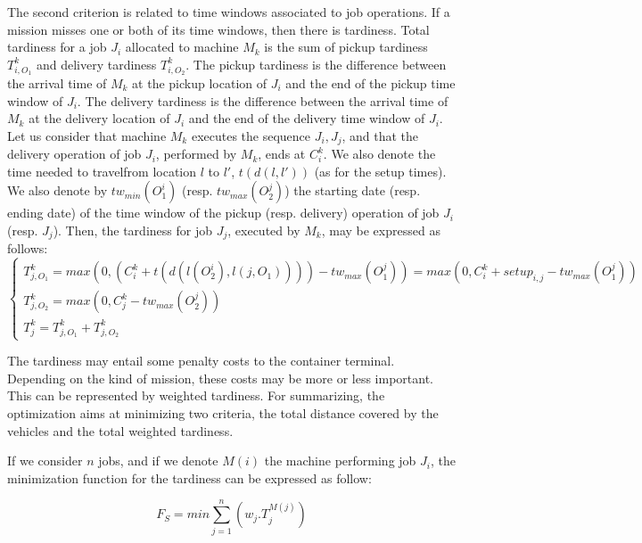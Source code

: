 \documentclass[a4paper,12pt]{article}
\begin{document}
The second criterion is related to time windows associated to job operations. If a mission misses one or both of its time windows, then there is tardiness. Total tardiness for a job $J_i$ allocated to machine $M_k$ is the sum of pickup tardiness $T^k_{i,O_1}$ and delivery tardiness $T^k_{i,O_2}$. The pickup tardiness is the difference between the arrival time of $M_k$ at the pickup location of $J_i$ and the end of the pickup time window of $J_i$. The delivery tardiness is the difference between the arrival time of $M_k$ at the delivery location of $J_i$ and the end of the delivery time window of $J_i$. \\

Let us consider that machine $M_k$ executes the sequence $J_i,J_j$, and that the delivery operation of job $J_i$, performed by $M_k$, ends at $C^k_i$. We also denote the time needed to travelfrom location $l$ to $l'$, $t(d(l,l'))$ (as for the setup times). We also denote by $tw_{min}(O^i_1)$ (resp. $tw_{max}(O^j_2)$) the starting date (resp. ending date) of the time window of the pickup (resp. delivery) operation of job $J_i$ (resp. $J_j$). Then, the tardiness for job $J_j$, executed by $M_k$, may be expressed as follows: 
\begin{equation*}
 \begin{cases}
    T^k_{j,O_1} = max(0, (C^k_i + t(d(l(O^i_2),l(j, O_1)))) - tw_{max}(O^j_1)) = max(0,C^k_i+setup_{i,j}-tw_{max}(O^j_1))\\
    T^k_{j,O_2} = max(0 ,C^k_j - tw_{max}(O^j_2))\\
    T^k_{j} = T^k_{j,O_1} + T^k_{j,O_2}
\end{cases}
\end{equation*}

The tardiness may entail some penalty costs to the container terminal. Depending on the kind of mission, these costs may be more or less important. This can be represented by weighted tardiness. For summarizing, the optimization aims at minimizing two criteria, the total distance covered by the vehicles and the total weighted tardiness. 

If we consider $n$ jobs, and if we denote $M(i)$ the machine performing job $J_i$, the minimization function for the tardiness can be expressed as follow:

\begin{equation*}
    F_S = min \sum_{j=1}^{n}(w_j.T^{M(j)}_{j})
\end{equation*}
 
\end{document}
